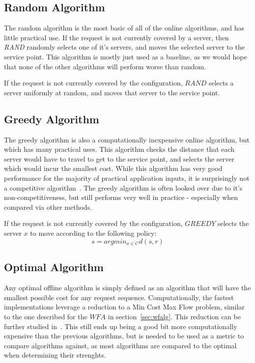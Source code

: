 
\subsection{Random Algorithm}
\label{sec:rand}
The random algorithm is the most basic of all of the online algorithms, and has little practical use. If the request is not currently covered by a server, then \textit{RAND} randomly selects one of it's servers, and moves the selected server to the service point. This algorithm is mostly just used as a baseline, as we would hope that none of the other algorithms will perform worse than random.

\begin{definition}
    If the request is not currently covered by the configuration, $RAND$ selects a server uniformly at random, and moves that server to the service point.
\end{definition}

\subsection{Greedy Algorithm}
\label{sec:greedy}
The greedy algorithm is also a computationally inexpensive online algorithm, but which has many practical uses. This algorithm checks the distance that each server would have to travel to get to the service point, and selects the server which would incur the smallest cost. While this algorithm has very good performance for the majority of practical application inputs, it is surprisingly not a competitive algorithm~\cite{OnlineComp1998}. The greedy algorithm is often looked over due to it's non-competitiveness, but still performs very well in practice - especially when compared via other methods.

\begin{definition}
    If the request is not currently covered by the configuration, $GREEDY$ selects the server $x$ to move according to the following policy:
    \begin{equation*}
        s = argmin_{x \in C} d(s, r)
    \end{equation*}
\end{definition}

\subsection{Optimal Algorithm}
\label{sec:OPT}
Any optimal offline algorithm is simply defined as an algorithm that will have the smallest possible cost for any request sequence. Computationally, the fastest implementations leverage a reduction to a Min Cost Max Flow problem, similar to the one described for the $WFA$ in section~\ref{sec:wfalg}. This reduction can be further studied in~\cite{WFA2009}. This still ends up being a good bit more computationally expensive than the previous algorithms, but is needed to be used as a metric to compare algorithms against, as most algorithms are compared to the optimal when determining their strenghts.

